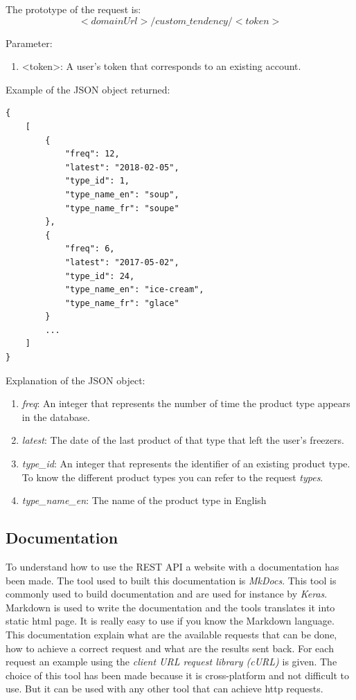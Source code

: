 The prototype of the request is:
$$<domainUrl>/custom\_tendency/<token>$$

Parameter:
\begin{enumerate}
\item <token>: A user's token that corresponds to an existing account.
\end{enumerate}

Example of the JSON object returned:
\begin{lstlisting}
{
    [
  		{
    		"freq": 12, 
    		"latest": "2018-02-05", 
    		"type_id": 1, 
    		"type_name_en": "soup", 
    		"type_name_fr": "soupe"
  		}, 
  		{
    		"freq": 6, 
    		"latest": "2017-05-02", 
    		"type_id": 24, 
    		"type_name_en": "ice-cream", 
    		"type_name_fr": "glace"
  		}
        ...
    ]
}
\end{lstlisting}

Explanation of the  JSON object:
\begin{enumerate}
\item \textit{freq}: An integer that represents the number of time the product type appears in the database.
\item \textit{latest}: The date of the last product of that type that left the user's freezers.
\item \textit{type\_id}: An integer that represents the identifier of an existing product type. To know the different product types you can refer to the request \textit{types}.
\item \textit{type\_name\_en}: The name of the product type in English
\end{enumerate}

\subsection{Documentation}
To understand how to use the REST API a website with a documentation has been made. The tool used to built this documentation is \textit{MkDocs}. This tool is commonly used to build documentation and are used for instance by \textit{Keras}. Markdown is used to write the documentation and the tools translates it into static html page. It is really easy to use if you know the Markdown language. \\

This documentation explain what are the available requests that can be done, how to achieve a correct request and what are the results sent back.
For each request an example using the \textit{client URL request library (cURL)} is given. The choice of this tool has been made because  it is cross-platform and not difficult to use. But it can be used with any other tool that can achieve http requests.

